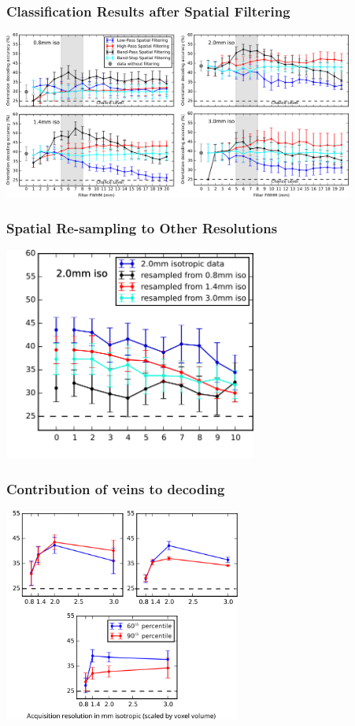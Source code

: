 \documentclass{beamer}
\begin{document}
  \begin{frame}
    \frametitle{Classification Results after Spatial Filtering}
        \begin{center}
            \includegraphics[height=5.5cm]{pics/spatial_smoothing_multires}
        \end{center}
    \end{frame} 

  \begin{frame}
    \frametitle{Spatial Re-sampling to Other Resolutions}
        \begin{center}
            \includegraphics[height=7cm]{pics/resampling}
        \end{center}
    \end{frame}

  \begin{frame}
    \frametitle{Contribution of veins to decoding}
        \begin{center}
            \includegraphics[height=7cm]{pics/veins}
        \end{center}
    \end{frame} 
\end{document}

